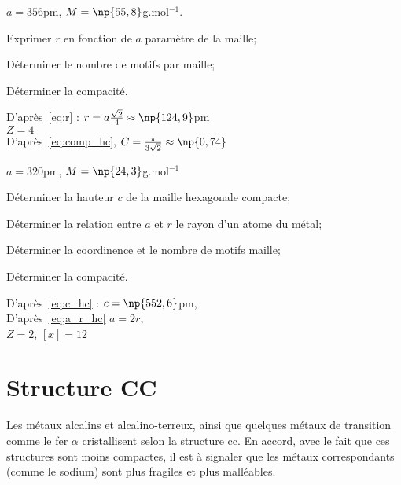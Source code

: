 \begin{ex}
    $a = 356$pm,
    $M = \np{55,8}$g.mol$^{-1}$.
    \begin{compactitem}
        \item Exprimer $r$ en fonction de $a$ paramètre
            de la maille;
        \item Déterminer le nombre de motifs par maille;
        \item Déterminer la compacité.
    \end{compactitem}
    D'après~\ref{eq:r} : $r = a\frac{\sqrt{2}}{4} \approx \np{124,9}$pm\\
    $Z = 4$\\
    D'après~\ref{eq:comp_hc}, $C = \frac{\pi}{3\sqrt{2}} \approx \np{0,74}$
\end{ex}
\begin{ex}
    $a = 320$pm,
    $M = \np{24,3}$g.mol$^{-1}$
    \begin{compactitem}
        \item Déterminer la hauteur $c$ de la maille hexagonale
            compacte;
        \item Déterminer la relation entre $a$ et $r$ le rayon
            d'un atome du métal;
        \item Déterminer la coordinence et le nombre de motifs
            maille;
        \item Déterminer la compacité.
    \end{compactitem}
    D'après~\ref{eq:c_hc} : $c = \np{552,6}$pm,\\
    D'après~\ref{eq;a_r_hc} $a = 2r$,\\
    $Z = 2$, $[x] = 12$
\end{ex}


\section{Structure CC}
Les métaux alcalins et alcalino-terreux, ainsi que quelques
métaux de transition comme le fer $\alpha$ cristallisent selon la structure cc.
En accord, avec le fait que ces structures sont moins compactes,
il est à signaler que les métaux correspondants (comme le sodium) sont
plus fragiles et plus malléables.

